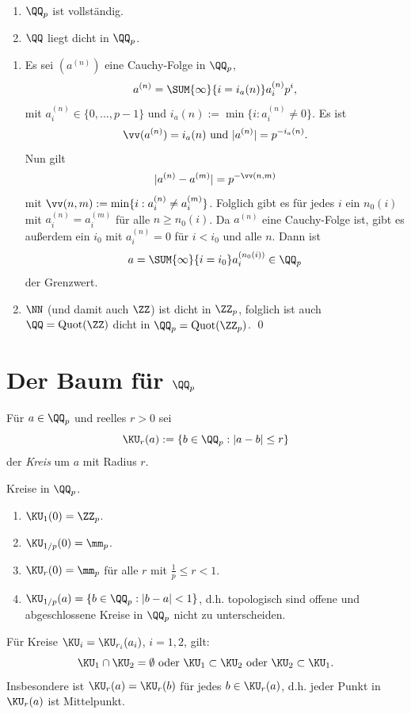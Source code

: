 \PROP\ \begin{enumerate}
\item $\QQ_p$ ist vollständig.
\item $\QQ$ liegt dicht in $\QQ_p$.
\end{enumerate}
\bew \begin{enumerate}
\item Es sei $(a^{(n)})$ eine Cauchy-Folge in $\QQ_p$,
\[
a^{(n)} = \SUM{\infty}{i=i_a(n)} a_i^{(n)} p^i,
\]
mit $a_i^{(n)}\in\{0,\ldots,p-1\}$ und
$i_a(n):=\min\{i:a^{(n)}_i\neq 0\}$.
Es ist
\[
\vv(a^{(n)}) = i_a(n) \text{ und } |a^{(n)}|=p^{-i_a(n)}.
\]
Nun gilt
\[
|a^{(n)}-a^{(m)}| = p^{-\vv(n,m)}
\]
mit $\vv(n,m):=\min\{i:a_i^{(n)}\neq a_i^{(m)}\}$.
Folglich gibt es für jedes $i$ ein $n_0(i)$ mit $a^{(n)}_i=a^{(m)}_i$
für alle $n\geq n_0(i)$.
Da $a^{(n)}$ eine Cauchy-Folge ist, gibt es außerdem ein $i_0$
mit $a_i^{(n)}=0$ für $i<i_0$ und alle $n$.
Dann ist
\[
a = \SUM{\infty}{i=i_0} a_i^{(n_0(i))} \in \QQ_p
\]
der Grenzwert.
\item $\NN$ (und damit auch $\ZZ$) ist dicht in $\ZZ_p$, 
folglich ist auch $\QQ=\mathrm{Quot}(\ZZ)$ dicht in
$\QQ_p=\mathrm{Quot}(\ZZ_p)$.
\qed
\end{enumerate}

\section{Der Baum für $\QQ_p$}\label{sec_baumQp}

\DEF Für $a\in \QQ_p$ und reelles $r>0$ sei
\[
\KU_r(a) := \{ b\in\QQ_p : |a-b|\leq r \}
\]
der \emph{Kreis}
um $a$ mit Radius $r$.

\BSP Kreise in $\QQ_p$.
\begin{enumerate}
\item $\KU_1(0)=\ZZ_p$.
\item $\KU_{1/p}(0)=\mm_p$.
\item $\KU_r(0)=\mm_p$ für alle $r$ mit $\frac{1}{p}\leq r < 1$.
\item $\KU_{1/p}(a)=\{ b\in\QQ_p:|b-a|<1 \}$, d.h. topologisch sind
offene und abgeschlossene Kreise in $\QQ_p$ nicht zu unterscheiden.
\end{enumerate}

\BEM Für Kreise $\KU_i=\KU_{r_i}(a_i)$, $i=1,2$, gilt:
\[
\KU_1\cap\KU_2=\emptyset\text{ oder }
\KU_1\subset \KU_2 \text{ oder }
\KU_2\subset \KU_1.
\]
Insbesondere ist $\KU_r(a)=\KU_r(b)$ für jedes $b\in\KU_r(a)$, d.h.
jeder Punkt in $\KU_r(a)$ ist Mittelpunkt.

